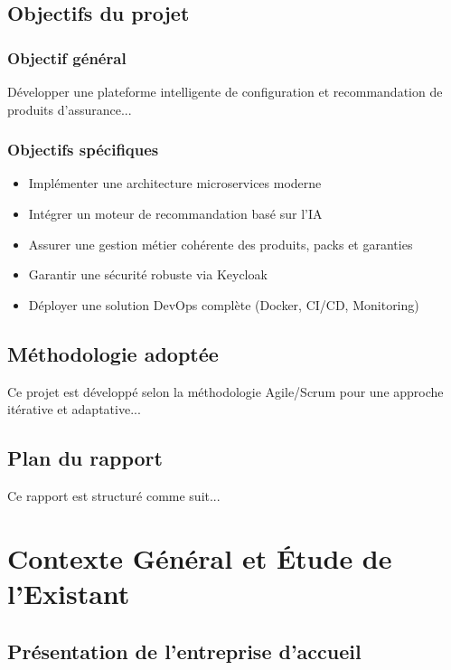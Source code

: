 \documentclass[12pt,a4paper]{report}
\begin{document}
\section{Objectifs du projet}
\subsection{Objectif général}
Développer une plateforme intelligente de configuration et recommandation de produits d'assurance...

\subsection{Objectifs spécifiques}
\begin{itemize}
    \item Implémenter une architecture microservices moderne
    \item Intégrer un moteur de recommandation basé sur l'IA
    \item Assurer une gestion métier cohérente des produits, packs et garanties
    \item Garantir une sécurité robuste via Keycloak
    \item Déployer une solution DevOps complète (Docker, CI/CD, Monitoring)
\end{itemize}

\section{Méthodologie adoptée}
Ce projet est développé selon la méthodologie Agile/Scrum pour une approche itérative et adaptative...

\section{Plan du rapport}
Ce rapport est structuré comme suit...

\chapter{Contexte Général et Étude de l'Existant}
\label{chap:contexte}

\section{Présentation de l'entreprise d'accueil}
\end{document}
